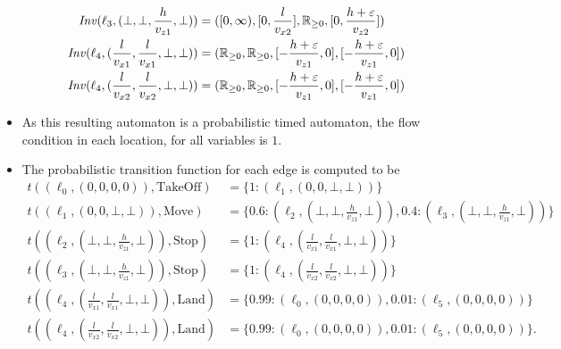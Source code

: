 \begin{ex}
\begin{itemize}
\begin{align*}
            \mathit{Inv}(\ell_{3},(\bot,\bot,\frac{h}{v_{z1}},\bot))&=([0,\infty),[0,\frac{l}{v_{x2}}],\mathbb{R}_{\geq0},[0,\frac{h+\varepsilon}{v_{z2}}]) \\
            \mathit{Inv}(\ell_{4},(\frac{l}{v_{x1}},\frac{l}{v_{x1}},\bot,\bot))&=(\mathbb{R}_{\geq0},\mathbb{R}_{\geq0},[-\frac{h+\varepsilon}{v_{z1}},0],[-\frac{h+\varepsilon}{v_{z1}},0]) \\
            \mathit{Inv}(\ell_{4},(\frac{l}{v_{x2}},\frac{l}{v_{x2}},\bot,\bot))&=(\mathbb{R}_{\geq0},\mathbb{R}_{\geq0},[-\frac{h+\varepsilon}{v_{z1}},0],[-\frac{h+\varepsilon}{v_{z1}},0])
    \end{align*}
    \item As this resulting automaton is a probabilistic timed automaton, the flow condition in each location, for all variables is $1$.
    \item The probabilistic transition function for each edge is computed to be
    \begin{align*}
        t((\ell_{0},(0,0,0,0)),\text{TakeOff})&=\{1:(\ell_{1},(0,0,\bot,\bot))\} \\
        t((\ell_{1},(0,0,\bot,\bot)),\text{Move})&=\{0.6:(\ell_{2},(\bot,\bot,\frac{h}{v_{z1}},\bot)),0.4:(\ell_{3},(\bot,\bot,\frac{h}{v_{z1}},\bot))\}\\
        t((\ell_{2},(\bot,\bot,\frac{h}{v_{z1}},\bot)),\text{Stop})&=\{1:(\ell_{4},(\frac{l}{v_{x1}},\frac{l}{v_{x1}},\bot,\bot))\} \\
        t((\ell_{3},(\bot,\bot,\frac{h}{v_{z1}},\bot)),\text{Stop})&=\{1:(\ell_{4},(\frac{l}{v_{x2}},\frac{l}{v_{x2}},\bot,\bot))\} \\
        t((\ell_{4},(\frac{l}{v_{x1}},\frac{l}{v_{x1}},\bot,\bot)),\text{Land})&=\{0.99:(\ell_{0},(0,0,0,0)),0.01:(\ell_{5},(0,0,0,0))\} \\
        t((\ell_{4},(\frac{l}{v_{x2}},\frac{l}{v_{x2}},\bot,\bot)),\text{Land})&=\{0.99:(\ell_{0},(0,0,0,0)),0.01:(\ell_{5},(0,0,0,0))\}.
    \end{align*}
\end{itemize}
\end{ex}
